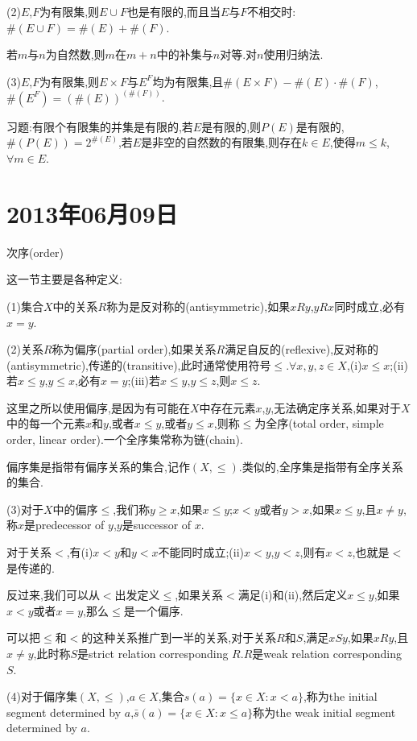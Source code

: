 \documentclass[12pt,a4paper,openany]{book}
\begin{document}
(2)$E$,$F$为有限集,则$E \cup F$也是有限的,而且当$E$与$F$不相交时:$\#(E \cup F) = \#(E) + \#(F)$.

若$m$与$n$为自然数,则$m$在$m+n$中的补集与$n$对等.对$n$使用归纳法.

(3)$E$,$F$为有限集,则$E \times F$与$E^F$均为有限集,且$\#(E \times F) - \#(E) \cdot \#(F)$,$\#(E^F)=(\#(E))^{(\#(F))}$.

习题:有限个有限集的并集是有限的,若$E$是有限的,则$P(E)$是有限的,$\#(P(E))=2^{\#(E)}$,若$E$是非空的自然数的有限集,则存在$k \in E$,使得$m \le k$,$\forall m \in E$.

\section{2013年06月09日}
次序(order)

这一节主要是各种定义:

(1)集合$X$中的关系$R$称为是反对称的(antisymmetric),如果$xRy$,$yRx$同时成立,必有$x=y$.

(2)关系$R$称为偏序(partial order),如果关系$R$满足自反的(reflexive),反对称的(antisymmetric),传递的(transitive),此时通常使用符号$\le$.$\forall x,y,z \in X$,(i)$x \le x$;(ii)若$x \le y$,$y \le x$,必有$x=y$;(iii)若$x \le y$,$y \le z$,则$x \le z$.

这里之所以使用偏序,是因为有可能在$X$中存在元素$x$,$y$,无法确定序关系,如果对于$X$中的每一个元素$x$和$y$,或者$x \le y$,或者$y \le x$,则称$\le$为全序(total order, simple order, linear order).一个全序集常称为链(chain).

偏序集是指带有偏序关系的集合,记作$(X, \le)$.类似的,全序集是指带有全序关系的集合.

(3)对于$X$中的偏序$\le$,我们称$y \ge x$,如果$x \le y$;$x < y$或者$y>x$,如果$x \le y$,且$x \neq y$,称$x$是predecessor of $y$,$y$是successor of $x$.

对于关系$<$,有(i)$x<y$和$y<x$不能同时成立;(ii)$x<y$,$y<z$,则有$x<z$,也就是$<$是传递的.

反过来,我们可以从$<$出发定义$\le$,如果关系$<$满足(i)和(ii),然后定义$x \le y$,如果$x<y$或者$x=y$,那么$\le$是一个偏序.

可以把$\le$和$<$的这种关系推广到一半的关系,对于关系$R$和$S$,满足$xSy$,如果$xRy$,且$x \neq y$,此时称$S$是strict relation corresponding $R$.$R$是weak relation corresponding $S$.

(4)对于偏序集$(X, \le)$,$a \in X$,集合$s(a)=\{x \in X: x < a\}$,称为the initial segment determined by $a$,$\bar{s}(a)=\{x \in X: x \le a\}$称为the weak initial segment determined by $a$.
\end{document}

